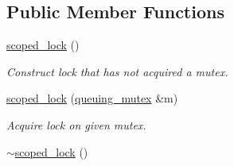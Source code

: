 \subsection*{Public Member Functions}
\begin{DoxyCompactItemize}
\item 
\hyperlink{classtbb_1_1queuing__mutex_1_1scoped__lock_a0afe0107eb0aae613e726f67624d2fca}{scoped\+\_\+lock} ()
\begin{DoxyCompactList}\small\item\em Construct lock that has not acquired a mutex. \end{DoxyCompactList}\item 
\hypertarget{classtbb_1_1queuing__mutex_1_1scoped__lock_aa82d9da0dcfe5b21f1c08473f8223105}{}\hyperlink{classtbb_1_1queuing__mutex_1_1scoped__lock_aa82d9da0dcfe5b21f1c08473f8223105}{scoped\+\_\+lock} (\hyperlink{classtbb_1_1queuing__mutex}{queuing\+\_\+mutex} \&m)\label{classtbb_1_1queuing__mutex_1_1scoped__lock_aa82d9da0dcfe5b21f1c08473f8223105}

\begin{DoxyCompactList}\small\item\em Acquire lock on given mutex. \end{DoxyCompactList}\item 
\hypertarget{classtbb_1_1queuing__mutex_1_1scoped__lock_a469ec43836a8dd250ce0a22b02945630}{}\hyperlink{classtbb_1_1queuing__mutex_1_1scoped__lock_a469ec43836a8dd250ce0a22b02945630}{$\sim$scoped\+\_\+lock} ()\label{classtbb_1_1queuing__mutex_1_1scoped__lock_a469ec43836a8dd250ce0a22b02945630}


\end{DoxyCompactItemize}
